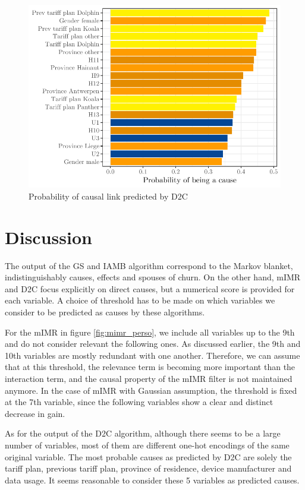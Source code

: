 \begin{figure}
    \centering
    \includegraphics[width=0.9\linewidth]{figures/d2c_proba.pdf}
    \caption{Probability of causal link predicted by D2C}
    \label{fig:d2c_proba}
\end{figure}

\section{Discussion}

The output of the GS and IAMB algorithm correspond to the Markov blanket,
indistinguishably causes, effects and spouses of churn. On the other hand, mIMR
and D2C focus explicitly on direct causes, but a numerical score is provided for
each variable. A choice of threshold has to be made on which variables we
consider to be predicted as causes by these algorithms.

For the mIMR in figure \ref{fig:mimr_perso}, we include all variables up to the
9th and do not consider relevant the following ones. As discussed earlier, the
9th and 10th variables are mostly redundant with one another. Therefore, we can
assume that at this threshold, the relevance term is becoming more important
than the interaction term, and the causal property of the mIMR filter is not
maintained anymore. In the case of mIMR with Gaussian assumption, the threshold
is fixed at the 7th variable, since the following variables show a clear and
distinct decrease in gain.

As for the output of the D2C algorithm, although there seems to be a large
number of variables, most of them are different one-hot encodings of the same
original variable. The most probable causes as predicted by D2C are solely the
tariff plan, previous tariff plan, province of residence, device manufacturer
and data usage. It seems reasonable to consider these 5 variables as predicted
causes.

